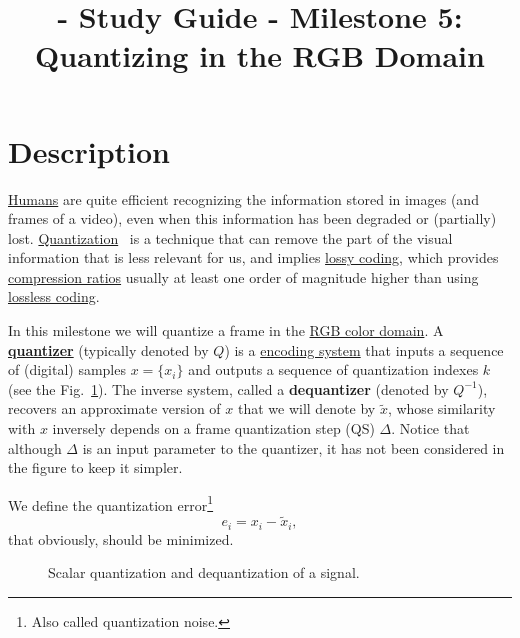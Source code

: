 
\title{\SM{} - Study Guide - Milestone 5: Quantizing in the RGB Domain}

\maketitle

\tableofcontents

\section{Description}
\href{https://en.wikipedia.org/wiki/Visual_system}{Humans} are quite
efficient recognizing the information stored in images (and frames of
a video), even when this information has been degraded or (partially)
lost. \href{https://en.wikipedia.org/wiki/Quantization_(signal_processing)}{Quantization}~\cite{sayood2017introduction,vetterli2014foundations}
is a technique that can remove the part of the visual information that
is less relevant for us, and implies
\href{https://en.wikipedia.org/wiki/Lossy_compression}{lossy coding},
which provides
\href{https://en.wikipedia.org/wiki/Data_compression_ratio}{compression
  ratios} usually at least one order of magnitude higher than using
\href{https://en.wikipedia.org/wiki/Lossless_compression}{lossless
  coding}.

In this milestone we will quantize a frame in the
\href{https://en.wikipedia.org/wiki/RGB_color_model}{RGB color
  domain}. A
\href{https://en.wikipedia.org/wiki/Quantization_(signal_processing)}{\textbf{quantizer}}
(typically denoted by $Q$) is a
\href{https://en.wikipedia.org/wiki/Data_compression}{encoding system}
that inputs a sequence of (digital) samples $x=\{x_i\}$ and outputs a
sequence of quantization indexes $k$ (see the Fig.~\ref{fig:Q}). The
inverse system, called a \textbf{dequantizer} (denoted by
$Q^{-1}$), recovers an approximate version of $x$ that we will denote
by $\tilde{x}$, whose similarity with $x$ inversely depends on a frame
quantization step (QS) $\Delta$. Notice that although $\Delta$ is an
input parameter to the quantizer, it has not been considered in the
figure to keep it simpler.

We define the quantization error\footnote{Also called quantization
noise.}
\begin{equation}
  e_i = x_i - \tilde{x}_i,
\end{equation}
that obviously, should be minimized.

\begin{figure}
  \centering
  \caption{Scalar quantization and dequantization of a signal.}
  \label{fig:Q}
\end{figure}

